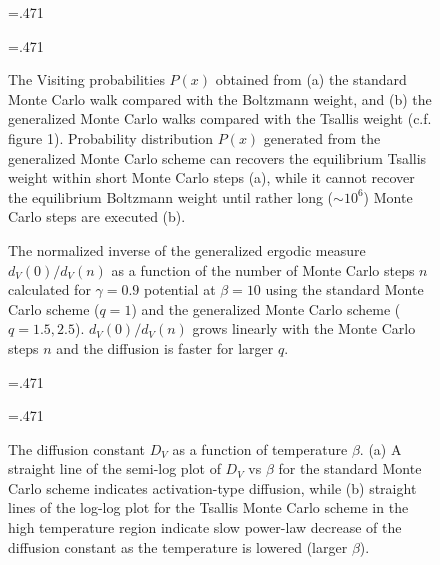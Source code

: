 \begin{figure}[th] 
\def\halftext{.471\textwidth} 
\parbox{.471\textwidth}{  \epsfxsize=.471\textwidth   {}  } 
\hspace{4mm} 
\parbox{.471\textwidth}{  \epsfxsize=.471\textwidth   {}  }
\caption{The Visiting probabilities $P(x)$ obtained from (a) the standard Monte Carlo walk compared with the Boltzmann weight, and (b) the generalized Monte Carlo  walks compared with the Tsallis weight (c.f. figure 1). Probability distribution $P(x)$ generated from the generalized Monte Carlo scheme can recovers the  equilibrium Tsallis weight within short Monte Carlo  steps (a), while it cannot recover the equilibrium  Boltzmann weight until rather long ($\sim 10^{6}$) Monte  Carlo steps are executed (b).}
\vspace*{20mm}
\label{fig:6}
\end{figure}

\begin{figure}[th]
\epsfxsize=8cm
 \centerline{}
\caption{The normalized inverse of the generalized ergodic  measure $d_{V}(0)/d_{V}(n)$ as a function of the number of Monte Carlo steps $n$ calculated for $\gamma=0.9$  potential at $\beta=10$ using the standard Monte Carlo scheme ($q=1$) and the generalized Monte Carlo scheme ($q=1.5, 2.5$). $d_{V}(0)/d_{V}(n)$ grows linearly with the Monte Carlo steps $n$ and the diffusion is faster  for larger $q$.}
\label{fig:7}
\end{figure}

\begin{figure}[th] 
\def\halftext{.471\textwidth} 
\parbox{.471\textwidth}{  \epsfxsize=.471\textwidth   {}  } 
\hspace{4mm} 
\parbox{.471\textwidth}{  \epsfxsize=.471\textwidth   {}  }
\caption{The diffusion constant $D_{V}$ as a function of  temperature $\beta$. (a) A straight line of the semi-log plot  of $D_{V}$ vs $\beta$ for the standard Monte Carlo scheme  indicates activation-type diffusion, while (b) straight  lines of the log-log plot for the Tsallis Monte Carlo scheme  in the high temperature region indicate slow power-law  decrease of the diffusion constant as the temperature is lowered (larger $\beta$).}
\vspace*{20mm}
\label{fig:8}
\end{figure}

